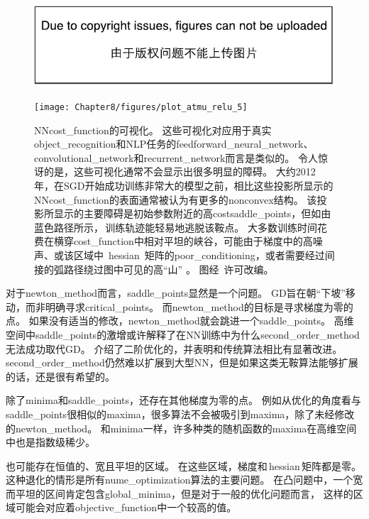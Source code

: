 \begin{figure}[!htb]
\ifOpenSource
\centerline{\includegraphics{figure.pdf}}
\else
\centerline{\texttt{[image: Chapter8/figures/plot\_atmu\_relu\_5]}}
\fi
\caption{\gls{NN}\gls{cost_function}的可视化。
这些可视化对应用于真实\gls{object_recognition}和\gls{NLP}任务的\gls{feedforward_neural_network}、\gls{convolutional_network}和\gls{recurrent_network}而言是类似的。
令人惊讶的是，这些可视化通常不会显示出很多明显的障碍。
大约2012年，在\gls{SGD}开始成功训练非常大的模型之前，相比这些投影所显示的\gls{NN}\gls{cost_function}的表面通常被认为有更多的\gls{nonconvex}结构。
该投影所显示的主要障碍是初始参数附近的高\gls{cost}\gls{saddle_points}，但如由蓝色路径所示，\,训练轨迹能轻易地逃脱该鞍点。
大多数训练时间花费在横穿\gls{cost_function}中相对平坦的峡谷，可能由于梯度中的高噪声、或该区域中~\gls{hessian}~矩阵的\gls{poor_conditioning}，或者需要经过间接的弧路径绕过图中可见的高``山'' 。
图经~\citet{GoodfellowOptimization15}许可改编。
}
\label{fig:chap8_plot_atmu_relu_5}
\end{figure}


对于\gls{newton_method}而言，\gls{saddle_points}显然是一个问题。
\gls{GD}旨在朝``下坡''移动，而非明确寻求\gls{critical_points}。
而\gls{newton_method}的目标是寻求梯度为零的点。
如果没有适当的修改，\gls{newton_method}就会跳进一个\gls{saddle_points}。
高维空间中\gls{saddle_points}的激增或许解释了在\gls{NN}训练中为什么\gls{second_order_method}无法成功取代\gls{GD}。
\cite{Dauphin-et-al-NIPS2014-small}介绍了二阶优化的，并表明和传统算法相比有显著改进。
\gls{second_order_method}仍然难以扩展到大型\gls{NN}，但是如果这类无鞍算法能够扩展的话，还是很有希望的。


除了\gls{minima}和\gls{saddle_points}，还存在其他梯度为零的点。
例如从优化的角度看与\gls{saddle_points}很相似的\gls{maxima}，很多算法不会被吸引到\gls{maxima}，除了未经修改的\gls{newton_method}。
和\gls{minima}一样，许多种类的随机函数的\gls{maxima}在高维空间中也是指数级稀少。


也可能存在恒值的、宽且平坦的区域。
在这些区域，梯度和\,\gls{hessian}\,矩阵都是零。
这种退化的情形是所有\gls{nume_optimization}算法的主要问题。
在凸问题中，一个宽而平坦的区间肯定包含\gls{global_minima}，但是对于一般的优化问题而言，
这样的区域可能会对应着\gls{objective_function}中一个较高的值。


